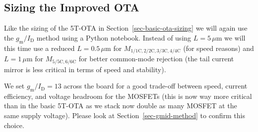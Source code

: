 \documentclass[
  a4paper,
  DIV=11,
  numbers=noendperiod]{scrartcl}
\begin{document}
\subsection{Sizing the Improved OTA}\label{sec-improved-ota-sizing}

Like the sizing of the 5T-OTA in Section~\ref{sec-basic-ota-sizing} we
will again use the \(g_\mathrm{m}/I_\mathrm{D}\) method using a Python
notebook. Instead of using \(L = 5\,\mu\text{m}\) we will this time use
a reduced \(L = 0.5\,\mu\text{m}\) for
\(M_\mathrm{1/1C,2/2C,3/3C,4/4C}\) (for speed reasons) and
\(L = 1\,\mu\text{m}\) for \(M_\mathrm{5/5C,6/6C}\) for better
common-mode rejection (the tail current mirror is less critical in terms
of speed and stability).

We set \(g_\mathrm{m}/I_\mathrm{D}= 13\) across the board for a good
trade-off between speed, current efficiency, and voltage headroom for
the MOSFETs (this is now way more critical than in the basic 5T-OTA as
we stack now double as many MOSFET at the same supply voltage). Please
look at Section~\ref{sec-gmid-method} to confirm this choice.
\end{document}
